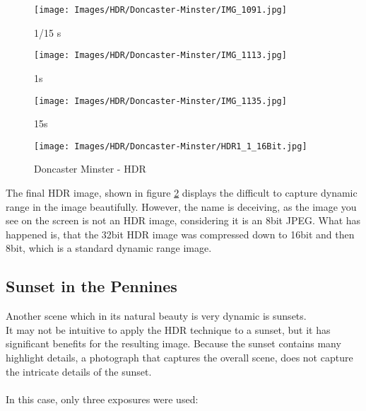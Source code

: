 \begin{figure}[htb]
\begin{minipage}{.32\textwidth}
	\centering
		\texttt{[image: Images/HDR/Doncaster-Minster/IMG\_1091.jpg]}
	\caption{1/15 s}
	\label{fig:IMG_1091}
\end{minipage}
\begin{minipage}{.32\textwidth}
	\centering
		\texttt{[image: Images/HDR/Doncaster-Minster/IMG\_1113.jpg]}
	\caption{1s}
	\label{fig:IMG_1113}
\end{minipage}
\begin{minipage}{.32\textwidth}
	\centering
		\texttt{[image: Images/HDR/Doncaster-Minster/IMG\_1135.jpg]}
	\caption{15s}
	\label{fig:IMG_1135}
\end{minipage}
\end{figure}



\begin{figure}[htb]
	\centering
		\texttt{[image: Images/HDR/Doncaster-Minster/HDR1\_1\_16Bit.jpg]}
	\caption{Doncaster Minster - HDR}
	\label{fig:HDR1_1_16Bit}
\end{figure}

The final \gls{HDR} image, shown in figure \ref{fig:HDR1_1_16Bit} displays the difficult to capture dynamic range in the image beautifully. However, the name is deceiving, as the image you see on the screen is not an \gls{HDR} image, considering it is an 8bit \gls{JPEG}. What has happened is, that the 32bit \gls{HDR} image was compressed down to 16bit and then 8bit, which is a standard dynamic range image.

\subsection{Sunset in the Pennines}

Another scene which in its natural beauty is very dynamic is sunsets.
\\
It may not be intuitive to apply the \gls{HDR} technique to a sunset, but it has significant benefits for the resulting image. Because the sunset contains many highlight details, a photograph that captures the overall scene, does not capture the intricate details of the sunset.
\\
\\
In this case, only three \glspl{exposure} were used:

